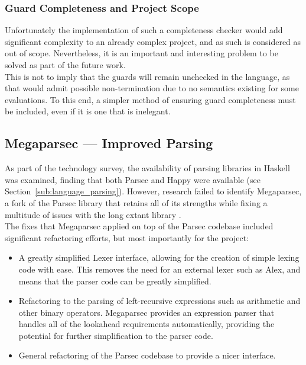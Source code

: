 
\subsubsection{Guard Completeness and Project Scope} %
\label{ssub:guard_completeness_and_project_scope}
Unfortunately the implementation of such a completeness checker would add significant complexity to an already complex project, and as such is considered as out of scope.
Nevertheless, it is an important and interesting problem to be solved as part of the future work.\\

This is not to imply that the guards will remain unchecked in the language, as that would admit possible non-termination due to no semantics existing for some evaluations.
To this end, a simpler method of ensuring guard completeness must be included, even if it is one that is inelegant. 



\subsection{Megaparsec --- Improved Parsing} %
\label{sub:megaparsec_improved_parsing}
As part of the technology survey, the availability of parsing libraries in Haskell was examined, finding that both Parsec and Happy were available (see Section~\ref{sub:language_parsing}). 
However, research failed to identify Megaparsec, a fork of the Parsec library that retains all of its strengths while fixing a multitude of issues with the long extant library \citep{megaparsec}.\\

The fixes that Megaparsec applied on top of the Parsec codebase included significant refactoring efforts, but most importantly for the project:
\begin{itemize}
    \item A greatly simplified Lexer interface, allowing for the creation of simple lexing code with ease.
    This removes the need for an external lexer such as Alex, and means that the parser code can be greatly simplified.
    \item Refactoring to the parsing of left-recursive expressions such as arithmetic and other binary operators. 
    Megaparsec provides an expression parser that handles all of the lookahead requirements automatically, providing the potential for further simplification to the parser code. 
    \item General refactoring of the Parsec codebase to provide a nicer interface.
\end{itemize}

